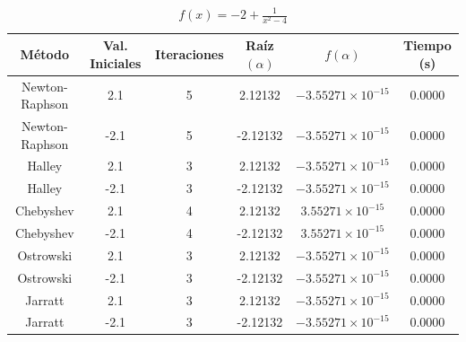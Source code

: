 \begin{table}[H]
\centering

\renewcommand{\arraystretch}{1.3} %
\setlength{\tabcolsep}{12pt}      %

\begin{tabular}{cccccc}
\hline
Método & Val. Iniciales & Iteraciones & Raíz $(\alpha)$ & $f(\alpha)$ & Tiempo (s) \\
\hline

Newton-Raphson & 2.1  & 5 & 2.12132  & $-3.55271\times10^{-15}$ & 0.0000 \\

Newton-Raphson & -2.1 & 5 & -2.12132 & $-3.55271\times10^{-15}$ & 0.0000 \\

Halley         & 2.1  & 3 & 2.12132  & $-3.55271\times10^{-15}$ & 0.0000 \\

Halley         & -2.1 & 3 & -2.12132 & $-3.55271\times10^{-15}$ & 0.0000 \\

Chebyshev      & 2.1  & 4 & 2.12132  & $3.55271\times10^{-15}$ & 0.0000 \\

Chebyshev      & -2.1 & 4 & -2.12132 & $3.55271\times10^{-15}$ & 0.0000 \\

Ostrowski      & 2.1  & 3 & 2.12132  & $-3.55271\times10^{-15}$ & 0.0000 \\

Ostrowski      & -2.1 & 3 & -2.12132 & $-3.55271\times10^{-15}$ & 0.0000 \\

Jarratt        & 2.1  & 3 & 2.12132  & $-3.55271\times10^{-15}$ & 0.0000 \\

Jarratt        & -2.1 & 3 & -2.12132 & $-3.55271\times10^{-15}$ & 0.0000 \\

\hline
\end{tabular}

\caption{$f(x) = -2 + \frac{1}{x^{2} - 4}$}
\end{table}


